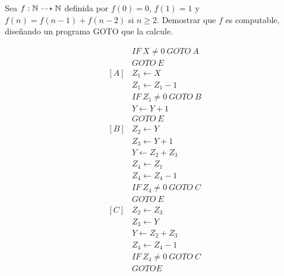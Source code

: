 \documentclass[twoside]{article}
\begin{document}
\begin{ejercicio}{14}
Sea $f : \mathbb{N} \dashrightarrow \mathbb{N}$ definida por $f(0) = 0$, $f(1) = 1$ y $f(n) = f(n - 1) + f(n - 2)$ si
$n \geq 2$. Demostrar que $f$ es computable, diseñando un programa GOTO que la calcule.
\end{ejercicio}
\begin{solucion}
\begin{align*}
 & IF\ X\neq 0\ GOTO\ A\\
 & GOTO\ E\\
[A] & Z_1\leftarrow X\\
    & Z_1\leftarrow Z_1-1\\
    & IF\ Z_1\neq 0\ GOTO\ B\\
    & Y\leftarrow Y+1\\
    & GOTO\ E\\
[B] & Z_2\leftarrow Y\\
    & Z_3\leftarrow Y+1\\
    & Y\leftarrow Z_2+Z_3\\
    & Z_4\leftarrow Z_1\\
    & Z_4\leftarrow Z_4-1\\
    & IF\ Z_4\neq 0\ GOTO\ C\\
    & GOTO\ E\\
[C] & Z_2\leftarrow Z_3\\
    & Z_3\leftarrow Y\\   
    & Y\leftarrow Z_2+Z_3\\
    &Z_4\leftarrow Z_4-1\\
    & IF\ Z_4\neq 0\ GOTO\ C\\
    & GOTO E
\end{align*}
\end{solucion}

\newpage
\end{document}
